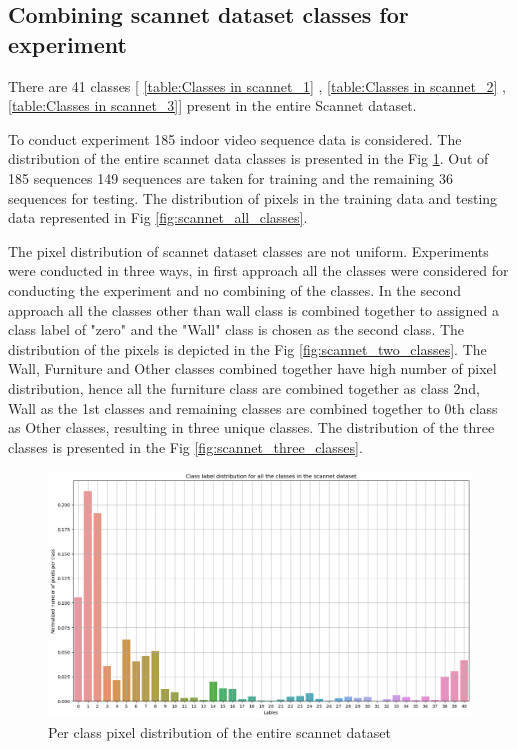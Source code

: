     \subsection{Combining scannet dataset classes for experiment}
    
	There are 41 classes [ \ref{table:Classes in scannet_1} , \ref{table:Classes in scannet_2} , \ref{table:Classes in scannet_3}] present in the entire Scannet dataset. 
    
    To conduct experiment 185 indoor video sequence data is considered. The distribution of the entire scannet data classes is presented in the Fig \ref{fig:scannet_class}. Out of 185 sequences 149 sequences are taken for training and the remaining 36 sequences for testing. The distribution of pixels in the training data and testing data represented in Fig \ref{fig:scannet_all_classes}.
    
    The pixel distribution of scannet dataset classes are not uniform. Experiments were conducted in three ways, in first approach all the classes were considered for conducting the experiment and no combining of the classes. In the second approach all the classes other than wall class is combined together to assigned a class label of "zero" and the "Wall" class is chosen as the second class. The distribution of the pixels is depicted in the Fig \ref{fig:scannet_two_classes}.
	The Wall, Furniture and Other classes combined together have high number of pixel distribution, hence all the furniture class are combined together as class 2nd, Wall as the 1st classes and remaining classes are combined together to 0th class as Other classes, resulting in three unique classes. The distribution of the three classes is presented in the Fig \ref{fig:scannet_three_classes}.
    
    \begin{figure}
    	\centering
    	\includegraphics[width=13cm]{images/scannet_data_class_distribution.png}
    	\caption{Per class pixel distribution of the entire scannet dataset}
    	\label{fig:scannet_class}
    \end{figure} 
    
